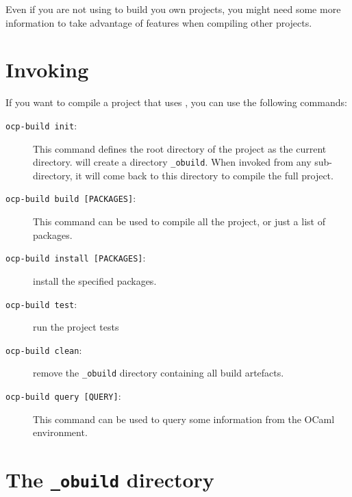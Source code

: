 
Even if you are not using \ocpbuild{} to build you own projects, you
might need some more information to take advantage of \ocpbuild{}
features when compiling other projects.

\section{Invoking \ocpbuild{}}

If you want to compile a project that uses \ocpbuild{}, you can use
the following commands:

\begin{description}
\item[{\tt ocp-build init}:] This command defines the root directory
  of the project as the current directory. \ocpbuild{} will create a
  directory {\tt \_obuild}. When invoked from any sub-directory, it
  will come back to this directory to compile the full project.
\item[{\tt ocp-build build [PACKAGES]}:] This command can be used to
  compile all the project, or just a list of packages.
\item[{\tt ocp-build install [PACKAGES]}:] install the specified
  packages.
\item[{\tt ocp-build test}:] run the project tests
\item[{\tt ocp-build clean}:] remove the {\tt \_obuild} directory
  containing all build artefacts.
\item[{\tt ocp-build query [QUERY]}:] This command can be used to
  query some information from the OCaml environment.
\end{description}


\section{The {\tt \_obuild} directory}

